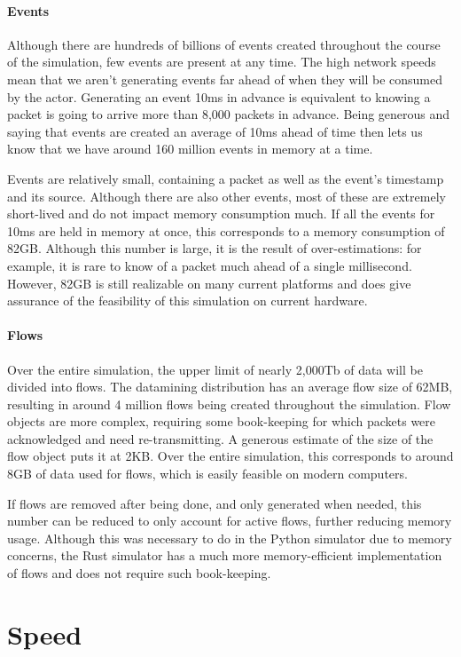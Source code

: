 \paragraph{Events}
Although there are hundreds of billions of events created throughout the course of the simulation, few events are present at any time.
The high network speeds mean that we aren't generating events far ahead of when they will be consumed by the actor.
Generating an event 10ms in advance is equivalent to knowing a packet is going to arrive more than 8,000 packets in advance.
Being generous and saying that events are created an average of 10ms ahead of time then lets us know that we have around 160 million events in memory at a time.

Events are relatively small, containing a packet as well as the event's timestamp and its source.
Although there are also other events, most of these are extremely short-lived and do not impact memory consumption much.
If all the events for 10ms are held in memory at once, this corresponds to a memory consumption of 82GB.
Although this number is large, it is the result of over-estimations: for example, it is rare to know of a packet much ahead of a single millisecond.
However, 82GB is still realizable on many current platforms and does give assurance of the feasibility of this simulation on current hardware.


\paragraph{Flows}
Over the entire simulation, the upper limit of nearly 2,000Tb of data will be divided into flows.
The datamining distribution has an average flow size of 62MB, resulting in around 4 million flows being created throughout the simulation.
Flow objects are more complex, requiring some book-keeping for which packets were acknowledged and need re-transmitting.
A generous estimate of the size of the flow object puts it at 2KB.
Over the entire simulation, this corresponds to around 8GB of data used for flows, which is easily feasible on modern computers.

If flows are removed after being done, and only generated when needed, this number can be reduced to only account for active flows, further reducing memory usage.
Although this was necessary to do in the Python simulator due to memory concerns, the Rust simulator has a much more memory-efficient implementation of flows and does not require such book-keeping.


\section{Speed} \label{limits-speed}

